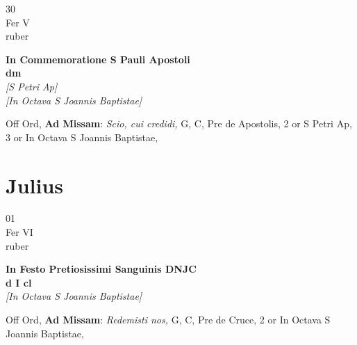 \documentclass[10pt, openany]{book}
\begin{document}
        \begin{center}
            \begin{minipage}{3.5in}
                \vspace{2em}
                \begin{minipage}{0.5in}
                    {\Huge 30} \\
                    {\normalsize Fer V} \\
                    {\normalsize ruber}
                \end{minipage}
                \begin{minipage}{3.0in}
                    \textbf{ \large In Commemoratione S Pauli Apostoli \\
                    \textnormal{\normalsize dm}} \\ \textit{[S Petri Ap]} \\ \textit{[In Octava S Joannis Baptistae]} \\ 
                \end{minipage}
                \begin{justify}Off Ord, \textbf{Ad Missam}: \textit{Scio, cui credidi,} G, C, Pre de Apostolis, 2 or S Petri Ap, 3 or In Octava S Joannis Baptistae,  
                \end{justify}
            \end{minipage}
        \end{center}
    
        \chapter{Julius}
                        
        \begin{center}
            \begin{minipage}{3.5in}
                \vspace{2em}
                \begin{minipage}{0.5in}
                    {\Huge 01} \\
                    {\normalsize Fer VI} \\
                    {\normalsize ruber}
                \end{minipage}
                \begin{minipage}{3.0in}
                    \textbf{ \large In Festo Pretiosissimi Sanguinis DNJC \\
                    \textnormal{\normalsize d I cl}} \\ \textit{[In Octava S Joannis Baptistae]} \\ 
                \end{minipage}
                \begin{justify}Off Ord, \textbf{Ad Missam}: \textit{Redemisti nos,} G, C, Pre de Cruce, 2 or In Octava S Joannis Baptistae,  
                \end{justify}
            \end{minipage}
        \end{center}
    
\end{document}
